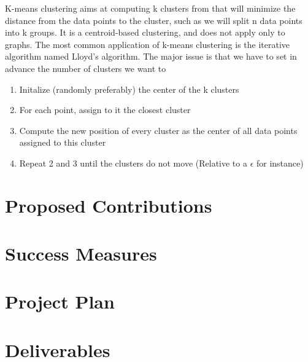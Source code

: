 \documentclass[11pt]{article}
\begin{document}
K-means clustering aims at computing k clusters from that will minimize the distance from the data points to the cluster, such as we will split n data points into k groups. It is a centroid-based clustering, and does not apply only to graphs.
The most common application of k-means clustering is the iterative algorithm named Lloyd's algorithm.
The major issue is that we have to set in advance the number of clusters we want to 

\begin{enumerate}
\item Initalize (randomly preferably) the center of the k clusters
\item For each point, assign to it the closest cluster
\item Compute the new position of every cluster as the center of all data points assigned to this cluster
\item Repeat 2 and 3 until the clusters do not move (Relative to a $\epsilon$ for instance)
\end{enumerate}








\section{Proposed Contributions}
\section{Success Measures}
\section{Project Plan}
\section{Deliverables}


    
    
\end{document}
